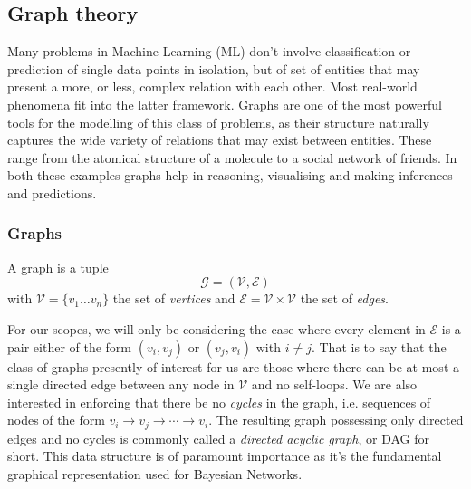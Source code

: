 \subsection{Graph theory}
Many problems in Machine Learning (ML) don't involve classification or prediction of single data points in isolation, but of set of entities that may present a more, or less, complex relation with each other. 
Most real-world phenomena fit into the latter framework.
Graphs are one of the most powerful tools for the modelling of this class of problems, as their structure naturally captures the wide variety of relations that may exist between entities.
These range from the atomical structure of a molecule to a social network of friends.  
In both these examples graphs help in reasoning, visualising and making inferences and predictions.

\subsubsection{Graphs}
\begin{definition}
	A graph is a tuple 
	\begin{equation}
	\mathcal{G} = (\mathcal{V}, \mathcal{E})
\end{equation}
with $\mathcal{V} = \{ v_1 \ldots v_n \}$ the set of \textit{vertices} and $\mathcal{E} = \mathcal{V} \times \mathcal{V}$ the set of \textit{edges}.
\end{definition}


For our scopes, we will only be considering the case where every element in $\mathcal{E}$ is a pair either of the form $(v_i, v_j)$ or $(v_j, v_i)$ with $i \neq j$.  
That is to say that the class of graphs presently of interest for us are those where there can be at most a single directed edge between any node in $\mathcal{V}$ and no self-loops.
We are also interested in enforcing that there be no \textit{cycles} in the graph, i.e. sequences of nodes of the form $v_i \rightarrow v_j \rightarrow \cdots \rightarrow v_i$.
The resulting graph possessing only directed edges and no cycles is commonly called a \textit{directed acyclic graph}, or DAG for short.  
This data structure is of paramount importance as it's the fundamental graphical representation used for Bayesian Networks.

